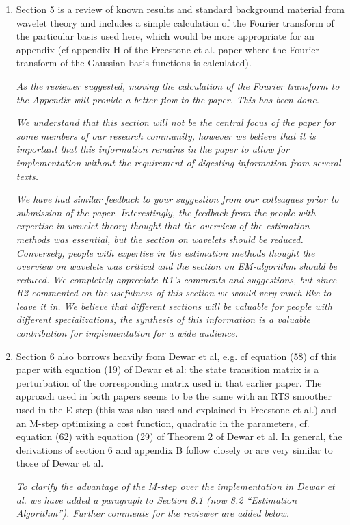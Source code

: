 \documentclass{article}
\begin{document}
\begin{enumerate}
        \item Section 5 is a review of known results and standard background material from wavelet theory and includes a simple calculation of the Fourier transform of the particular basis used here, which would be more appropriate for an appendix (cf appendix H of the Freestone et al. paper where the Fourier transform of the Gaussian basis functions is calculated).


\emph{As the reviewer suggested, moving the calculation of the Fourier transform to the Appendix will provide a better flow to the paper. This has been done.}

\emph{We understand that this section will not be the central focus of the paper for some members of our research community, however we believe that it is important that this information remains in the paper to allow for implementation without the requirement of digesting information from several texts.} 

\emph{We have had similar feedback to your suggestion from our colleagues prior to submission of the paper. Interestingly, the feedback from the people with expertise in wavelet theory thought that the overview of the estimation methods was essential, but the section on wavelets should be reduced. Conversely, people with expertise in the estimation methods thought the overview on wavelets was critical and the section on EM-algorithm should be reduced. We completely appreciate R1's comments and suggestions, but since R2 commented on the usefulness of this section we would very much like to leave it in. We believe that different sections will be valuable for people with different specializations, the synthesis of this information is a valuable contribution for implementation for a wide audience.}

        \item Section 6 also borrows heavily from Dewar et al, e.g. cf equation (58) of this paper with equation (19) of Dewar et al: the state transition matrix is a perturbation of the corresponding matrix used in that earlier paper. The approach used in both papers seems to be the same with an RTS smoother used in the E-step (this was also used and explained in Freestone et al.) and an M-step optimizing a cost function, quadratic in the parameters, cf. equation (62) with equation (29) of Theorem 2 of Dewar et al. In general, the derivations of section 6 and appendix B follow closely or are very similar to those of Dewar et al.

		\emph{To clarify the advantage of the M-step over the implementation in Dewar et al. we have added a paragraph to Section 8.1 (now 8.2 ``Estimation Algorithm''). Further comments for the reviewer are added below.}
		

\end{enumerate}
\end{document}
